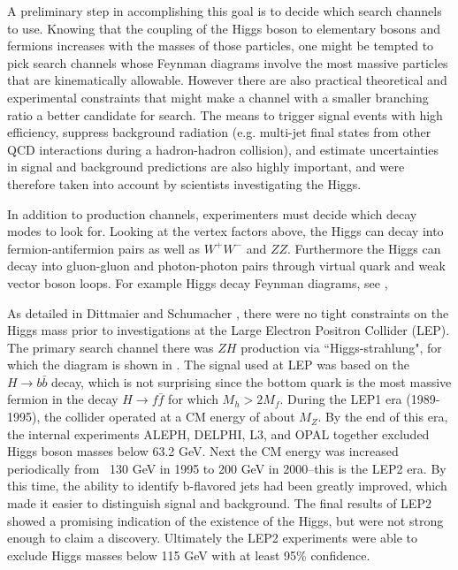 A preliminary step in accomplishing this goal is to decide which search 
channels to use. Knowing that the coupling of the Higgs boson to elementary 
bosons and fermions increases with the masses of those particles, one might be 
tempted to pick search channels whose Feynman diagrams involve the most massive
particles that are kinematically allowable. However there are 
also practical theoretical and experimental constraints that might make a 
channel with a smaller branching ratio a better candidate for search. The 
means to trigger signal events with high efficiency, suppress background 
radiation (e.g. multi-jet final states from other QCD interactions during a
hadron-hadron collision), and estimate uncertainties in signal and background 
predictions are also highly important, and were therefore taken into account by
scientists investigating the Higgs.

In addition to production channels, experimenters must decide which
decay modes to look for. Looking at the vertex factors above, the Higgs 
can decay into fermion-antifermion pairs as well as $W^{+}W^{-}$ and $ZZ$.
Furthermore the Higgs can decay into gluon-gluon and photon-photon pairs
through virtual quark and weak vector boson loops. For example Higgs decay
Feynman diagrams, see ,

As detailed in Dittmaier and Schumacher \cite{dittmaier_higgs_2013}, 
there were no tight
constraints on the Higgs mass prior to investigations at the Large Electron
Positron Collider (LEP). The primary search
channel there was $ZH$ production via ``Higgs-strahlung", for which the diagram
is shown in . 
The signal used at LEP was based on the $H\to b\bar{b}$ 
decay, which is not surprising since the bottom quark is the most 
massive fermion in the decay $H\to f\bar{f}$ for which $M_{h}>2M_{f}$. During
the LEP1 era (1989-1995), the collider operated at a CM energy of about $M_Z$. 
By the end of this era, the internal experiments ALEPH, DELPHI, L3, and OPAL 
together excluded Higgs boson masses below 63.2 GeV. Next the CM energy was
increased periodically from ~130 GeV in 1995 to 200 GeV in 2000--this is the
LEP2 era. By this time, the ability to identify b-flavored jets had been
greatly improved, which made it easier to distinguish signal and background. 
The final results of LEP2 showed a promising indication of the existence of
the Higgs, but were not strong enough to claim a discovery. Ultimately
the LEP2 experiments were able to exclude Higgs masses below 115 GeV with at
least 95\% confidence.


